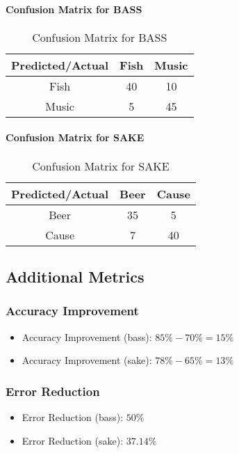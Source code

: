 \documentclass[journal,onecolumn]{IEEEtran}
\begin{document}
\paragraph{Confusion Matrix for BASS}
\begin{table}[H]
\caption{Confusion Matrix for BASS}
\centering
\begin{tabular}{|c|c|c|}
\hline
\textbf{Predicted/Actual} & \textbf{Fish} & \textbf{Music} \\ \hline
Fish & 40 & 10 \\ \hline
Music & 5 & 45 \\ \hline
\end{tabular}
\end{table}

\paragraph{Confusion Matrix for SAKE}
\begin{table}[H]
\caption{Confusion Matrix for SAKE}
\centering
\begin{tabular}{|c|c|c|}
\hline
\textbf{Predicted/Actual} & \textbf{Beer} & \textbf{Cause} \\ \hline
Beer & 35 & 5 \\ \hline
Cause & 7 & 40 \\ \hline
\end{tabular}
\end{table}

\subsection{Additional Metrics}
\subsubsection{Accuracy Improvement}
\begin{itemize}
    \item Accuracy Improvement (bass): $85\% - 70\% = 15\%$
    \item Accuracy Improvement (sake): $78\% - 65\% = 13\%$
\end{itemize}

\subsubsection{Error Reduction}
\begin{itemize}
    \item Error Reduction (bass): $50\%$
    \item Error Reduction (sake): $37.14\%$
\end{itemize}
\end{document}

